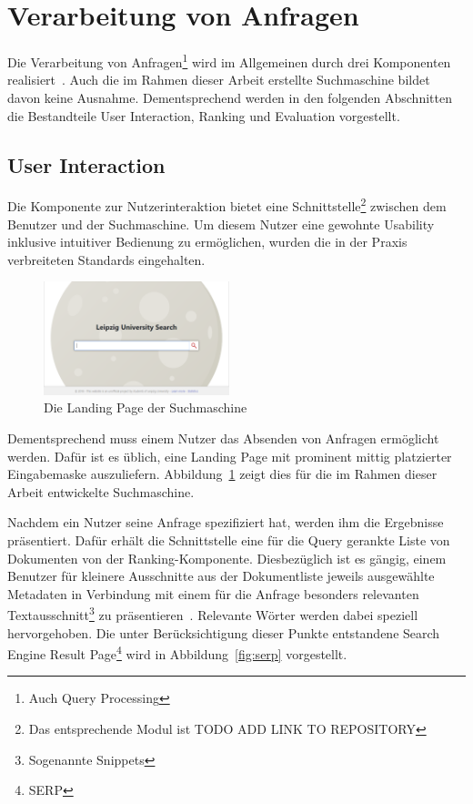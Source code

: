 \section{Verarbeitung von Anfragen}
\label{chap:query_processing}

Die Verarbeitung von Anfragen\footnote{Auch Query Processing} wird im Allgemeinen durch drei Komponenten realisiert~\cite{croft.chap2}.
Auch die im Rahmen dieser Arbeit erstellte Suchmaschine bildet davon keine Ausnahme.
Dementsprechend werden in den folgenden Abschnitten die Bestandteile User Interaction, Ranking und Evaluation vorgestellt.

\subsection{User Interaction~\cite{croft.chap2}}
\label{chap:query_processing}

Die Komponente zur Nutzerinteraktion bietet eine Schnittstelle\footnote{Das entsprechende Modul ist TODO ADD LINK TO REPOSITORY}
zwischen dem Benutzer und der Suchmaschine.
Um diesem Nutzer eine gewohnte Usability inklusive intuitiver Bedienung zu ermöglichen,
wurden die in der Praxis verbreiteten Standards eingehalten.

\begin{figure}
	\vspace*{-0.4cm}
	\includegraphics[width=0.48\textwidth]{chapter_query_processing/frontend_landing_page.png}
	\caption{Die Landing Page der Suchmaschine}
	\label{fig:landing_page}
	\vspace*{-0.2cm}
\end{figure}


Dementsprechend muss einem Nutzer das Absenden von Anfragen ermöglicht werden.
Dafür ist es üblich, eine Landing Page mit prominent mittig platzierter Eingabemaske auszuliefern\cite{}.
Abbildung~\ref{fig:landing_page} zeigt dies für die im Rahmen dieser Arbeit entwickelte Suchmaschine.

Nachdem ein Nutzer seine Anfrage spezifiziert hat, werden ihm die Ergebnisse präsentiert.
Dafür erhält die Schnittstelle eine für die Query gerankte Liste von Dokumenten von der Ranking-Komponente.
Diesbezüglich ist es gängig, einem Benutzer für kleinere Ausschnitte aus der Dokumentliste jeweils 
ausgewählte Metadaten in Verbindung mit einem 
für die Anfrage besonders relevanten Textausschnitt\footnote{Sogenannte Snippets} zu präsentieren~\cite{}.
Relevante Wörter werden dabei speziell hervorgehoben.
Die unter Berücksichtigung dieser Punkte entstandene Search Engine Result Page\footnote{SERP} wird in Abbildung~\ref{fig:serp} vorgestellt.

